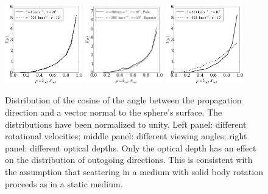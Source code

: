 \begin{figure}[h]
\centerline{
\includegraphics[width=0.30\textwidth]{../Figures/fig12a.pdf}
\includegraphics[width=0.30\textwidth]{../Figures/fig12b.pdf}
\includegraphics[width=0.30\textwidth]{../Figures/fig12c.pdf}}
\caption[]{Distribution of the cosine of the angle between the
propagation direction and a vector normal to the sphere's
surface. The distributions have been normalized to unity. Left
panel: different rotational velocities; middle panel: different
viewing angles; right panel: different optical depths. Only the
optical depth has an effect on the distribution of outogoing
directions. This is consistent with the assumption that \lya
scattering in a medium with solid body rotation proceeds as in a
static medium.}
\label{fig:surface}
\end{figure}
%
